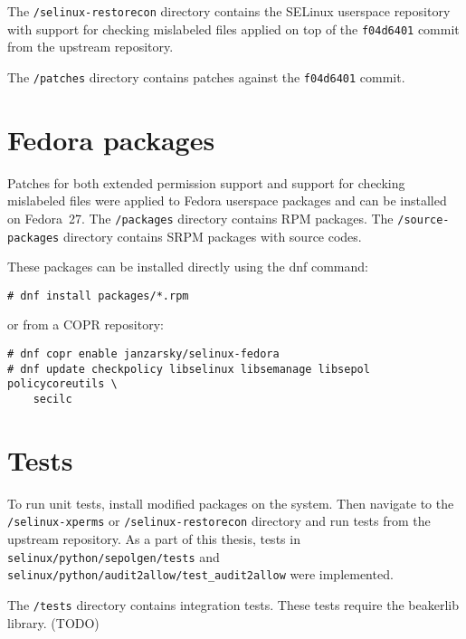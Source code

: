 The \texttt{/selinux-restorecon} directory contains the SELinux userspace
repository with support for checking mislabeled files applied on top of the
\texttt{f04d6401} commit from the upstream repository.

The \texttt{/patches} directory contains patches against the \texttt{f04d6401}
commit.

\section{Fedora packages}

Patches for both extended permission support and support for checking mislabeled
files were applied to Fedora userspace packages and can be installed on
Fedora~27. The \texttt{/packages} directory contains RPM packages. The
\texttt{/source-packages} directory contains SRPM packages with source codes.

These packages can be installed directly using the dnf command:
\begin{lstlisting}
# dnf install packages/*.rpm
\end{lstlisting}
or from a COPR repository:
\begin{lstlisting}
# dnf copr enable janzarsky/selinux-fedora
# dnf update checkpolicy libselinux libsemanage libsepol policycoreutils \
    secilc
\end{lstlisting}

\section{Tests}
To run unit tests, install modified packages on the system. Then navigate to the
\\ \texttt{/selinux-xperms} or \texttt{/selinux-restorecon} directory and run
tests from the upstream repository. As a part of this thesis, tests in
\texttt{selinux/python/sepolgen/tests} and \\
\texttt{selinux/python/audit2allow/test\_audit2allow} were implemented.

The \texttt{/tests} directory contains integration tests. These tests require
the beakerlib library. (TODO)

